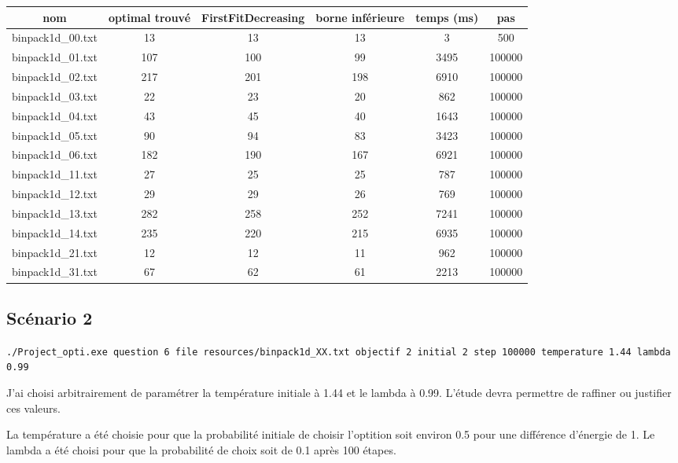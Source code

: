 \documentclass[10pt,a4paper]{article}
\begin{document}
\begin{center}
  \begin{tabular}{ | c | c | c | c | c | c | }  \hline
    nom               & optimal trouvé   & FirstFitDecreasing & borne inférieure & temps (ms) & pas    \\ \hline
    binpack1d\_00.txt & 13 & 13 & 13 & 3 & 500 \\ \hline
    binpack1d\_01.txt & 107 & 100 & 99 & 3495 & 100000 \\ \hline
    binpack1d\_02.txt & 217 & 201 & 198 & 6910 & 100000 \\ \hline
    binpack1d\_03.txt & 22 & 23 & 20 & 862 & 100000 \\ \hline
    binpack1d\_04.txt & 43 & 45 & 40 & 1643 & 100000 \\ \hline
    binpack1d\_05.txt & 90 & 94 & 83 & 3423 & 100000 \\ \hline
    binpack1d\_06.txt & 182 & 190 & 167 & 6921 & 100000 \\ \hline
    binpack1d\_11.txt & 27 & 25 & 25 & 787 & 100000 \\ \hline
    binpack1d\_12.txt & 29 & 29 & 26 & 769 & 100000 \\ \hline
    binpack1d\_13.txt & 282 & 258 & 252 & 7241 & 100000 \\ \hline
    binpack1d\_14.txt & 235 & 220 & 215 & 6935 & 100000 \\ \hline
    binpack1d\_21.txt & 12 & 12 & 11 & 962 & 100000 \\ \hline
    binpack1d\_31.txt & 67 & 62 & 61 & 2213 & 100000 \\ \hline
  \end{tabular}
\end{center}

\subsection{Scénario 2}

\texttt{./Project\_opti.exe question 6 file resources/binpack1d\_XX.txt objectif 2 initial 2 step 100000 temperature 1.44 lambda 0.99}

J'ai choisi arbitrairement de paramétrer la température initiale à 1.44 et le lambda à 0.99. L'étude devra permettre de raffiner ou justifier ces valeurs.

La température a été choisie pour que la probabilité initiale de choisir l'optition soit environ 0.5 pour une différence d'énergie de 1.
Le lambda a été choisi pour que la probabilité de choix soit de 0.1 après 100 étapes.
\end{document}
